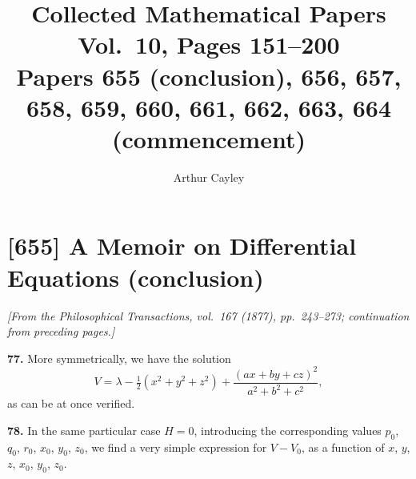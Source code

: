 \documentclass[11pt,a4paper]{article}
\title{\textbf{Collected Mathematical Papers}\\[4pt]
\Large Vol.~10, Pages 151--200\\[8pt]
\large Papers 655 (conclusion), 656, 657, 658, 659, 660, 661, 662, 663, 664 (commencement)}
\author{Arthur Cayley}
\date{}
\theoremstyle{plain}
\theoremstyle{definition}
\begin{document}
\maketitle
\thispagestyle{fancy}

\tableofcontents
\newpage

\section{[655] A Memoir on Differential Equations (conclusion)}
\label{sec:655}

\noindent\textit{[From the \emph{Philosophical Transactions}, vol.~167 (1877), pp.~243--273; continuation from preceding pages.]}

\medskip

\noindent\textbf{77.} More symmetrically, we have the solution
\[
V = \lambda - \tfrac{1}{2}(x^2 + y^2 + z^2) + \frac{(ax + by + cz)^2}{a^2 + b^2 + c^2},
\]
as can be at once verified.

\smallskip

\noindent\textbf{78.} In the same particular case $H = 0$, introducing the corresponding values $p_0$, $q_0$, $r_0$, $x_0$, $y_0$, $z_0$, we find a very simple expression for $V - V_0$, as a function of $x$, $y$, $z$, $x_0$, $y_0$, $z_0$.
\end{document}
